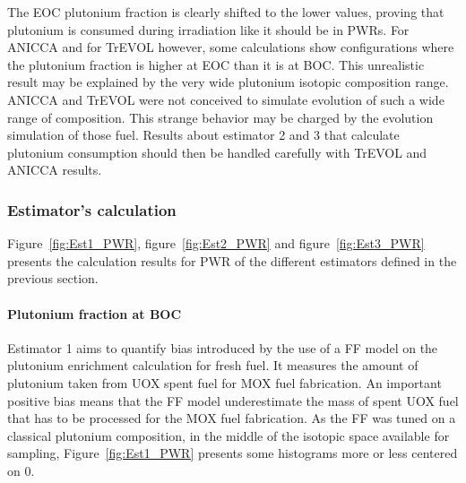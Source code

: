 The EOC plutonium fraction is clearly shifted to the lower values, proving that
plutonium is consumed during irradiation like it should be in PWRs. For ANICCA
and for TrEVOL however, some calculations show configurations where the
plutonium fraction is higher at EOC than it is at BOC. This unrealistic result
may be explained by the very wide plutonium isotopic composition range. ANICCA
and TrEVOL were not conceived to simulate evolution of such a wide range of
composition. This strange behavior may be charged by the evolution simulation of
those fuel. Results about estimator 2 and 3 that calculate plutonium consumption
should then be handled carefully with TrEVOL and ANICCA results.   

\subsubsection{Estimator's calculation}

Figure~\ref{fig:Est1_PWR}, figure~\ref{fig:Est2_PWR} and
figure~\ref{fig:Est3_PWR} presents the calculation results for PWR of the
different estimators defined in the previous section. 

\paragraph{Plutonium fraction at BOC}
Estimator 1 aims to quantify bias introduced by the use of a FF model on the
plutonium enrichment calculation for fresh fuel. It measures the amount of
plutonium taken from UOX spent fuel for MOX fuel fabrication. An important
positive bias means that the FF model underestimate the mass of spent UOX fuel
that has to be processed for the MOX fuel fabrication. As the FF was tuned on a
classical plutonium composition, in the middle of the isotopic space available
for sampling, Figure~\ref{fig:Est1_PWR} presents some histograms more or less
centered on 0.
        

